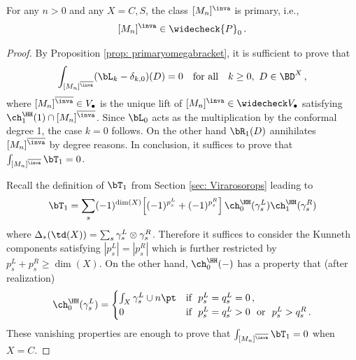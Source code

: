 \begin{lemma}
\notready
\label{Lem: Mnp}
    For any $n>0$ and any $X=C,S$, the class $[M_{n}]^\inva$ is primary, i.e.,
$$
[M_n]^\inva\in \widecheck{P}_0\,.
$$
\end{lemma}
\begin{proof}
By Proposition \ref{prop: primaryomegabracket}, it is sufficient to prove that
$$
\int_{[M_{n}]^{\overline{\inva}}} (\bL_k - \delta_{k,0})(D) =0\quad \textnormal{for all}\quad k\geq 0,\ D\in \BD^X\,,
$$
where $[M_{n}]^{\overline{\inva}}\in V_\bullet$ is the unique lift of $[M_n]^\inva\in \widecheck V_\bullet$ satisfying $\ch^\HH_1(1)\cap [M_{n}]^{\overline{\inva}}$. Since $\bL_0$ acts as the multiplication by the conformal degree 1, the case $k=0$ follows. On the other hand $\bR_{1}(D)$ annihilates $[M_{n}]^{\overline{\inva}}$ by degree reasons. In conclusion, it suffices to prove that $\int_{[M_{n}]^{\overline{\inva}}} \bT_{1}=0$.

Recall the definition of $\bT_1$ from Section \ref{sec: Virarosorops} leading to
\begin{align*}
    \bT_1=\sum_s (-1)^{\dim(X)}\Big[(-1)^{p_s^L}+(-1)^{p_s^R}\Big]\,\ch_0^\HH(\gamma_s^L)\ch_1^\HH(\gamma_s^R)
\end{align*}
where $\Delta_*(\td(X))=\sum_s \gamma_s^L\otimes \gamma_s^R$. Therefore it suffices to consider the Kunneth components satisfying $|p_s^L|=|p_s^R|$ which is further restricted by $p_s^L+p_s^R\geq \dim(X)$. On the other hand, $\ch_0^\HH(-)$ has a property that (after realization)
$$\ch_0^\HH(\gamma_s^L)=\begin{cases}
\int_X \gamma_s^L\cup n\pt &\textnormal{if}\ \  p_s^L=q_s^L=0\,,\\
0&\textnormal{if}\ \ p_s^L=q_s^L>0 \ \textnormal{ or } \ p_s^L>q_s^R\,.
\end{cases}
$$
These vanishing properties are enough to prove that $\int_{[M_{n}]^{\overline{\inva}}} \bT_{1}=0$ when $X=C$.


\end{proof}

